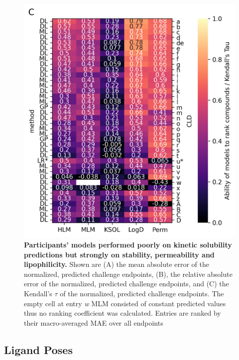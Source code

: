 \documentclass[journal=jcim,manuscript=article]{achemso}
\begin{document}
\begin{figure}
    \includegraphics[scale=0.6]{04_figs_leaderboards/ktau.png}
  \caption{\textbf{Participants' models performed poorly on kinetic solubility predictions but strongly on stability, permeability and lipophilicity.} Shown are (A) the mean absolute error of the normalized, predicted challenge endpoints, (B), the relative absolute error of the normalized, predicted challenge endpoints, and (C) the Kendall's $\tau$ of the normalized, predicted challenge endpoints. The empty cell at entry \textit{w} MLM consisted of constant predicted values thus no ranking coefficient was calculated. Entries are ranked by their macro-averaged MAE over all endpoints}
  \label{fgr:heatmaps_admet}
\end{figure}

\subsection{Ligand Poses}
\end{document}
